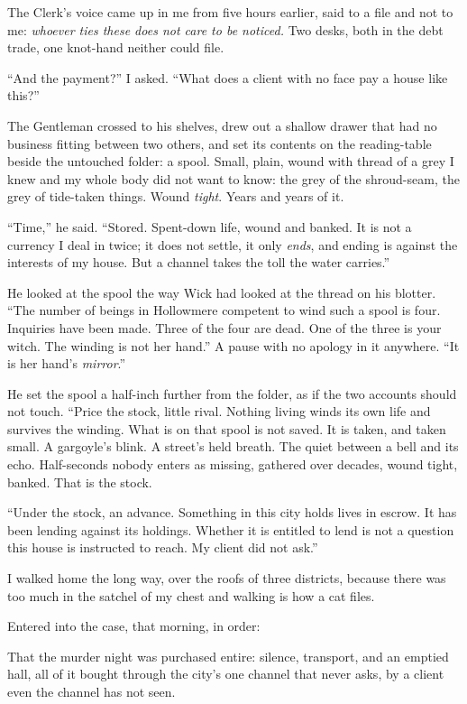 The Clerk's voice came up in me from five hours earlier, said to a file and not to me: \emph{whoever ties these does not care to be noticed.} Two desks, both in the debt trade, one knot-hand neither could file.

``And the payment?'' I asked. ``What does a client with no face pay a house like this?''

The Gentleman crossed to his shelves, drew out a shallow drawer that had no business fitting between two others, and set its contents on the reading-table beside the untouched folder: a spool. Small, plain, wound with thread of a grey I knew and my whole body did not want to know: the grey of the shroud-seam, the grey of tide-taken things. Wound \emph{tight}. Years and years of it.

``Time,'' he said. ``Stored. Spent-down life, wound and banked. It is not a currency I deal in twice; it does not settle, it only \emph{ends}, and ending is against the interests of my house. But a channel takes the toll the water carries.''

He looked at the spool the way Wick had looked at the thread on his blotter. ``The number of beings in Hollowmere competent to wind such a spool is four. Inquiries have been made. Three of the four are dead. One of the three is your witch. The winding is not her hand.'' A pause with no apology in it anywhere. ``It is her hand's \emph{mirror}.''

He set the spool a half-inch further from the folder, as if the two accounts should not touch. ``Price the stock, little rival. Nothing living winds its own life and survives the winding. What is on that spool is not saved. It is taken, and taken small. A gargoyle's blink. A street's held breath. The quiet between a bell and its echo. Half-seconds nobody enters as missing, gathered over decades, wound tight, banked. That is the stock.

``Under the stock, an advance. Something in this city holds lives in escrow. It has been lending against its holdings. Whether it is entitled to lend is not a question this house is instructed to reach. My client did not ask.''

\scenebreak

I walked home the long way, over the roofs of three districts, because there was too much in the satchel of my chest and walking is how a cat files.

Entered into the case, that morning, in order:

That the murder night was purchased entire: silence, transport, and an emptied hall, all of it bought through the city's one channel that never asks, by a client even the channel has not seen.

